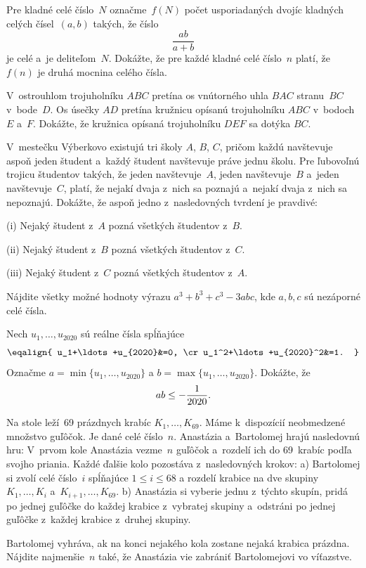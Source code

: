 {%
 Pre kladné celé číslo~$N$ označme~$f(N)$ počet usporiadaných dvojíc kladných celých čísel~$(a,b)$ takých, že číslo
$$\frac{ab}{a+b}$$
je celé a~je deliteľom~$N$. Dokážte, že pre každé kladné celé číslo~$n$ platí, že $f(n)$ je druhá mocnina celého čísla.}

{%
 V~ostrouhlom trojuholníku $ABC$ pretína os vnútorného uhla $BAC$ stranu~$BC$ v~bode~$D$. Os úsečky $AD$ pretína kružnicu opísanú trojuholníku $ABC$ v~bodoch~$E$ a~$F$. Dokážte, že kružnica opísaná trojuholníku $DEF$ sa dotýka $BC$.}

{%
 V~mestečku Výberkovo existujú tri školy $A$, $B$, $C$, pričom každú navštevuje aspoň jeden študent a~každý študent navštevuje práve jednu školu. Pre ľubovoľnú trojicu študentov takých, že jeden navštevuje~$A$, jeden navštevuje~$B$ a~jeden navštevuje~$C$, platí, že nejakí dvaja z~nich sa poznajú a~nejakí dvaja z~nich sa nepoznajú. Dokážte, že aspoň jedno z~nasledovných tvrdení je pravdivé:
\item{(i)} Nejaký študent z~$A$ pozná všetkých študentov z~$B$.
\item{(ii)} Nejaký študent z~$B$ pozná všetkých študentov z~$C$.
\item{(iii)} Nejaký študent z~$C$ pozná všetkých študentov z~$A$.}

{%
 Nájdite všetky možné hodnoty výrazu $a^3+b^3+c^3-3abc$, kde $a,b,c$ sú nezáporné celé čísla.}

{%
 Nech $u_1,\ldots,u_{2020}$ sú reálne čísla spĺňajúce
$$
\eqalign{
u_1+\ldots+u_{2020}&=0, \cr
u_1^2+\ldots+u_{2020}^2&=1.
}
$$
Označme $a=\min\{u_1,\ldots,u_{2020}\}$ a $b=\max\{u_1,\ldots,u_{2020}\}$. Dokážte, že
$$
ab \leq -\frac1{2020}.
\belowdisplayskip0pt
$$}

{%
 Na stole leží~69 prázdnych krabíc $K_1,\ldots,K_{69}$. Máme k~dispozícií neobme\-dze\-né množstvo guľôčok. Je dané celé číslo~$n$. Anastázia a~Bartolomej hrajú nasledovnú hru: V~prvom kole Anastázia vezme~$n$ guľôčok a~rozdelí ich do 69~krabíc podľa svojho priania. Každé ďalšie kolo pozostáva z~nasledovných krokov:
	\ite a) Bartolomej si zvolí celé číslo~$i$ spĺňajúce $1 \leq i \leq 68$ a rozdelí krabice na dve skupiny $K_1,\ldots,K_i$ a~$K_{i+1},\ldots,K_{69}$.
	\ite b) Anastázia si vyberie jednu z~týchto skupín, pridá po jednej guľôčke do každej krabice z~vybratej skupiny a~odstráni po jednej guľôčke z~každej krabice z~druhej skupiny.
	
Bartolomej vyhráva, ak na konci nejakého kola zostane nejaká krabica prázdna. Nájdite najmenšie~$n$ také, že Anastázia vie zabrániť Bartolomejovi vo víťazstve.}

